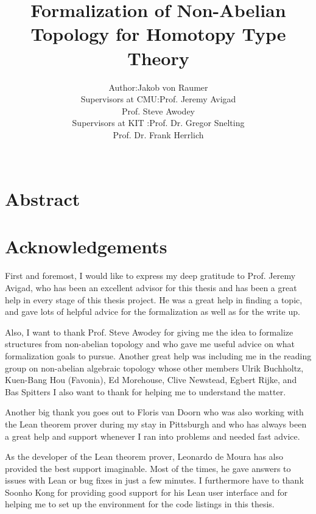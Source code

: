 \documentclass[12pt,headings=optiontohead]{book}
\theoremstyle{definition}
\begin{document}
\title{Formalization of Non-Abelian Topology for Homotopy Type Theory}
\author{\begin{tabular}{r@{ }l} 
Author:      & Jakob von Raumer \\[1ex] 
Supervisors at CMU: & Prof. Jeremy Avigad\\
             & Prof. Steve Awodey \\[1ex]
Supervisors at KIT : & Prof. Dr. Gregor Snelting\\
			& Prof. Dr. Frank Herrlich
\end{tabular}\\
}

\frontmatter
\maketitle

\chapter*{Abstract}



\chapter*{Acknowledgements}

First and foremost, I would like to express my deep gratitude to Prof. Jeremy Avigad,
who has been an excellent advisor for this thesis and has been a great help
in every stage of this thesis project.
He was a great help in finding a topic, and gave lots of helpful advice for the
formalization as well as for the write up.

Also, I want to thank Prof. Steve Awodey for giving me the idea to formalize structures
from non-abelian topology and who gave me useful advice on what formalization goals
to pursue.
Another great help was including me in the reading group on non-abelian algebraic
topology whose other members 
Ulrik Buchholtz, Kuen-Bang Hou (Favonia), Ed Morehouse, Clive Newstead, Egbert Rijke, and Bas Spitters
I also want to thank for helping me to understand the matter.

Another big thank you goes out to Floris van Doorn who was also working with the Lean
theorem prover during my stay in Pittsburgh and who has always been a great help
and support whenever I ran into problems and needed fast advice.

As the developer of the Lean theorem prover, Leonardo de Moura has also provided
the best support imaginable.
Most of the times, he gave answers to issues with Lean or bug fixes in just a
few minutes.
I furthermore have to thank Soonho Kong for providing good support for his Lean
user interface and for helping me to set up the environment for the code listings
in this thesis.
\end{document}
